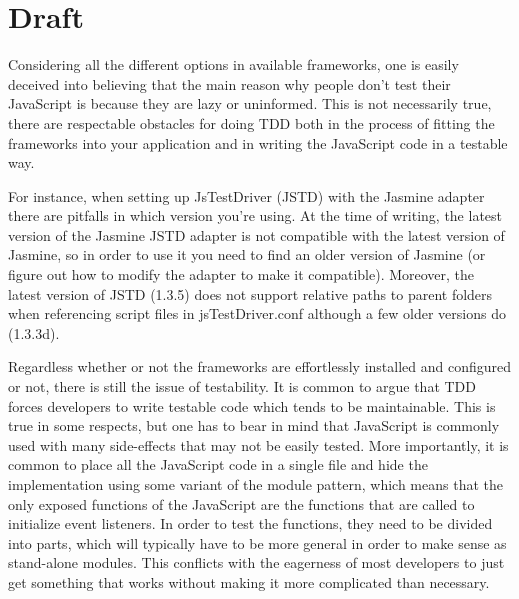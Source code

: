 \documentclass[11pt]{article}
\begin{document}

\section{Draft}

Considering all the different options in available frameworks, one is easily deceived into believing that the main reason why people don't test their JavaScript is because they are lazy or uninformed. This is not necessarily true, there are respectable obstacles for doing TDD both in the process of fitting the frameworks into your application and in writing the JavaScript code in a testable way.

For instance, when setting up JsTestDriver (JSTD) with the Jasmine adapter there are pitfalls in which version you're using. At the time of writing, the latest version of the Jasmine JSTD adapter is not compatible with the latest version of Jasmine, so in order to use it you need to find an older version of Jasmine (or figure out how to modify the adapter to make it compatible). Moreover, the latest version of JSTD (1.3.5) does not support relative paths to parent folders when referencing script files in jsTestDriver.conf although a few older versions do (1.3.3d).

Regardless whether or not the frameworks are effortlessly installed and configured or not, there is still the issue of testability. It is common to argue that TDD forces developers to write testable code which tends to be maintainable. This is true in some respects, but one has to bear in mind that JavaScript is commonly used with many side-effects that may not be easily tested. More importantly, it is common to place all the JavaScript code in a single file and hide the implementation using some variant of the module pattern\cite{ModulePattern}, which means that the only exposed functions of the JavaScript are the functions that are called to initialize event listeners. In order to test the functions, they need to be divided into parts, which will typically have to be more general in order to make sense as stand-alone modules. This conflicts with the eagerness of most developers to just get something that works without making it more complicated than necessary.
\end{document}
